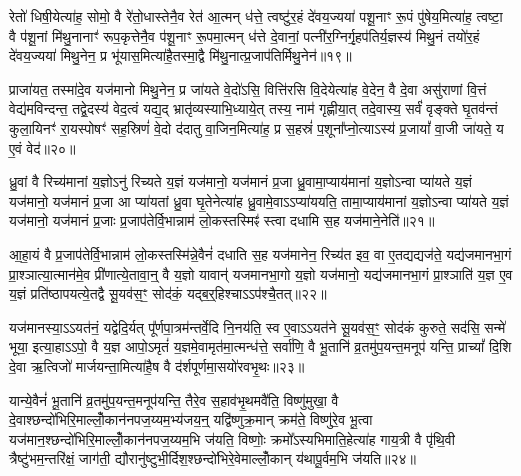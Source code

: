 रेतो॑ धिषी॒येत्या॑ह॒ सोमो॒ वै रे॑तो॒धास्तेनै॒व रेत॑ आ॒त्मन् ध॑त्ते॒ त्वष्टु॑र॒हं दे॑वय॒ज्यया॑ पशू॒नाꣳ रू॒पं पु॑षेय॒मित्या॑ह॒ त्वष्टा॒ वै प॑शू॒नां मि॑थु॒नानाꣳ॑ रूप॒कृत्तेनै॒व प॑शू॒नाꣳ रू॒पमा॒त्मन् ध॑त्ते दे॒वानां॒ पत्नी॑र॒ग्निर्गृ॒हप॑तिर्य॒ज्ञस्य॑ मिथु॒नं तयो॑र॒हं दे॑वय॒ज्यया॑ मिथु॒नेन॒ प्र भू॑यास॒मित्या॑है॒तस्मा॒द्वै मि॑थु॒नात्प्र॒जाप॑तिर्मिथु॒नेन॑॥१९॥

प्राजा॑यत॒ तस्मा॑दे॒व यज॑मानो मिथु॒नेन॒ प्र जा॑यते वे॒दो॑\-ऽसि॒ वित्ति॑रसि वि॒देयेत्या॑ह वे॒देन॒ वै दे॒वा असु॑राणां वि॒त्तं वेद्य॑मविन्दन्त॒ तद्वे॒दस्य॑ वेद॒त्वं यद्य॒द् भ्रातृ॑व्यस्याभि॒ध्याये॒त् तस्य॒ नाम॑ गृह्णीया॒त् तदे॒वास्य॒ सर्वं॑ वृङ्क्ते घृ॒तव॑न्तं कुला॒यिनꣳ॑ रा॒यस्पोषꣳ॑ सह॒स्रिणं॑ वे॒दो द॑दातु वा॒जिन॒मित्या॑ह॒ प्र स॒हस्रं॑ प॒शूना᳚प्नो॒त्या\-ऽस्य॑ प्र॒जायां᳚ वा॒जी जा॑यते॒ य ए॒वं वेद॑॥२०॥

{\anuvakamend[{द॒र्॒\mbox{}श॒पू॒र्ण॒मा॒सयो॑रुभ॒यतो॑ देवा॒श्वाः सु॒रेताः᳚ प्र॒जाप॑तिर्मिथु॒नेना᳚\-ऽ\-ऽप्नोत्य॒ष्टौ च॑॥४॥}]}

ध्रु॒वां वै रिच्य॑मानां य॒ज्ञो\-ऽनु॑ रिच्यते य॒ज्ञं यज॑मानो॒ यज॑मानं प्र॒जा ध्रु॒वामा॒प्याय॑मानां य॒ज्ञो\-ऽन्वा प्या॑यते य॒ज्ञं यज॑मानो॒ यज॑मानं प्र॒जा आ प्या॑यतां ध्रु॒वा घृ॒तेनेत्या॑ह ध्रु॒वामे॒वा\-ऽ\-ऽप्या॑ययति॒ तामा॒प्याय॑मानां य॒ज्ञो\-ऽन्वा प्या॑यते य॒ज्ञं यज॑मानो॒ यज॑मानं प्र॒जाः प्र॒जाप॑तेर्वि॒भान्नाम॑ लो॒कस्तस्मिꣴ॑ स्त्वा दधामि स॒ह यज॑माने॒नेति॑॥२१॥

आ॒हा॒यं वै प्र॒जाप॑तेर्वि॒भान्नाम॑ लो॒कस्तस्मि॑न्ने॒वैनं॑ दधाति स॒ह यज॑मानेन॒ रिच्य॑त इव॒ वा ए॒तद्यद्यज॑ते॒ यद्य॑जमानभा॒गं प्रा॒श्ञात्या॒त्मान॑मे॒व प्री॑णात्ये॒तावा॒न्॒ वै य॒ज्ञो यावान्॑ यजमानभा॒गो य॒ज्ञो यज॑मानो॒ यद्य॑जमानभा॒गं प्रा॒श्ञाति॑ य॒ज्ञ ए॒व य॒ज्ञं प्रति॑ष्ठापयत्ये॒तद्वै सू॒यव॑स॒ꣳ॒ सोद॑कं॒ यद्ब॒र्॒\mbox{}हिश्चा\-ऽ\-ऽप॑श्चै॒तत्॥२२॥

यज॑मानस्या॒\-ऽ\-ऽयत॑नं॒ यद्वेदि॒र्यत् पू᳚र्णपा॒त्रम॑न्तर्वे॒दि नि॒नय॑ति॒ स्व ए॒वा\-ऽ\-ऽयत॑ने सू॒यव॑स॒ꣳ॒ सोद॑कं कुरुते॒ सद॑सि॒ सन्मे॑ भूया॒ इत्या॒हा\-ऽ\-ऽपो॒ वै य॒ज्ञ आपो॒\-ऽमृतं॑ य॒ज्ञमे॒वामृत॑मा॒त्मन्ध॑त्ते॒ सर्वा॑णि॒ वै भू॒तानि॑ व्र॒तमु॑प॒यन्त॒मनूप॑ यन्ति॒ प्राच्यां᳚ दि॒शि दे॒वा ऋ॒त्विजो॑ मार्जयन्ता॒मित्या॑है॒ष वै द॑र्\mbox{}शपूर्णमा॒सयो॑रवभृ॒थः॥२३॥

यान्ये॒वैनं॑ भू॒तानि॑ व्र॒तमु॑प॒यन्त॒मनूप॑यन्ति॒ तैरे॒व स॒हाव॑भृ॒थमवै॑ति॒ विष्णु॑मुखा॒ वै दे॒वाश्छन्दो॑भिरि॒माल्लोँ॒कान॑नप\-ज॒य्यम॒भ्य॑जय॒न्॒ यद्वि॑ष्णुक्र॒मान् क्रम॑ते॒ विष्णु॑रे॒व भू॒त्वा यज॑मान॒श्छन्दो॑भिरि॒माल्लोँ॒कान॑नपज॒य्यम॒भि ज॑यति॒ विष्णोः॒ क्रमो᳚\-ऽस्यभिमाति॒हेत्या॑ह गाय॒त्री वै पृ॑थि॒वी त्रैष्टु॑भम॒न्तरि॑क्षं॒ जाग॑ती॒ द्यौरानु॑ष्टुभी॒र्दिश॒श्छन्दो॑भिरे॒वेमाल्लोँ॒कान् य॑थापू॒र्वम॒भि ज॑यति॥२४॥

